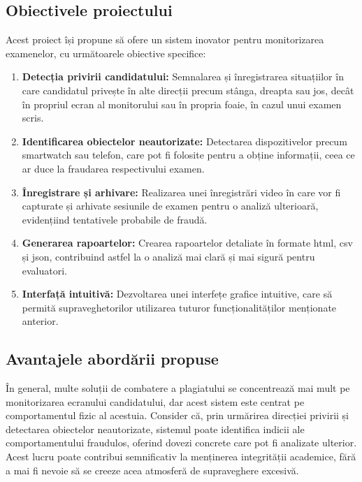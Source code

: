 \documentclass[12pt,a4paper]{article}
\begin{document}
\subsection{Obiectivele proiectului}

Acest proiect își propune să ofere un sistem inovator pentru monitorizarea examenelor, cu următoarele obiective specifice:

\begin{enumerate}[label=\arabic*.]
    \item \textbf{Detecția privirii candidatului:} Semnalarea și înregistrarea situațiilor
    în care candidatul privește în alte direcții precum stânga, dreapta sau jos, 
    decât în propriul ecran al monitorului sau în propria foaie, în cazul unui examen scris.
    
    \item \textbf{Identificarea obiectelor neautorizate:} Detectarea dispozitivelor precum
    smartwatch sau telefon, care pot fi folosite pentru a obține informații, 
    ceea ce ar duce la fraudarea respectivului examen.
    
    \item \textbf{Înregistrare și arhivare:} Realizarea unei înregistrări video în care 
    vor fi capturate și arhivate sesiunile de examen pentru o analiză ulterioară, 
    evidențiind tentativele probabile de fraudă.
    
    \item \textbf{Generarea rapoartelor:} Crearea rapoartelor detaliate în formate html, csv și json,
    contribuind astfel la o analiză mai clară și mai sigură pentru evaluatori.
    
    \item \textbf{Interfață intuitivă:} Dezvoltarea unei interfețe grafice intuitive, care să permită
    supraveghetorilor utilizarea tuturor funcționalităților menționate anterior.
\end{enumerate}

\subsection{Avantajele abordării propuse}

\hspace{6mm}În general, multe soluții de combatere a plagiatului se concentrează mai mult 
pe monitorizarea ecranului candidatului, dar acest sistem este centrat pe 
comportamentul fizic al acestuia. Consider că, prin urmărirea direcției privirii 
și detectarea obiectelor neautorizate, sistemul poate identifica indicii ale
comportamentului fraudulos, oferind dovezi concrete care pot fi analizate ulterior. 
Acest lucru poate contribui semnificativ la menținerea integrității academice, 
fără a mai fi nevoie să se creeze acea atmosferă de supraveghere excesivă.
\end{document}

